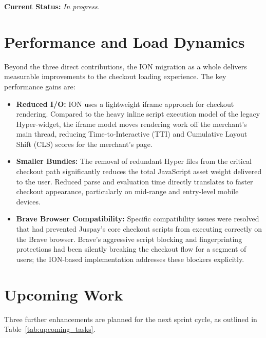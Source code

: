 \noindent \textbf{Current Status:} \textit{In progress.}

\section{Performance and Load Dynamics}

Beyond the three direct contributions, the ION migration as a whole delivers measurable improvements to the checkout loading experience. The key performance gains are:

\begin{itemize}
  \item \textbf{Reduced I/O:} ION uses a lightweight iframe approach for checkout rendering. Compared to the heavy inline script execution model of the legacy Hyper-widget, the iframe model moves rendering work off the merchant's main thread, reducing Time-to-Interactive (TTI) and Cumulative Layout Shift (CLS) scores for the merchant's page.

  \item \textbf{Smaller Bundles:} The removal of redundant Hyper files from the critical checkout path significantly reduces the total JavaScript asset weight delivered to the user. Reduced parse and evaluation time directly translates to faster checkout appearance, particularly on mid-range and entry-level mobile devices.

  \item \textbf{Brave Browser Compatibility:} Specific compatibility issues were resolved that had prevented Juspay's core checkout scripts from executing correctly on the Brave browser. Brave's aggressive script blocking and fingerprinting protections had been silently breaking the checkout flow for a segment of users; the ION-based implementation addresses these blockers explicitly.
\end{itemize}

\section{Upcoming Work}

Three further enhancements are planned for the next sprint cycle, as outlined in Table~\ref{tab:upcoming_tasks}.

